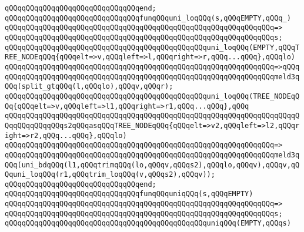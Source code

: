 \verb|qQQqqQQqqQQqqQQqqQQqqQQqqQQqqQQqend;|\newline
\newline
\newline
\verb|qQQqqQQqqQQqqQQqqQQqqQQqqQQqqQQqfunqQQquni_loqQQq(s,qQQqEMPTY,qQQq_)|\newline
\verb|qQQqqQQqqQQqqQQqqQQqqQQqqQQqqQQqqQQqqQQqqQQqqQQqqQQqqQQqqQQqqQQq=>|\newline
\verb|qQQqqQQqqQQqqQQqqQQqqQQqqQQqqQQqqQQqqQQqqQQqqQQqqQQqqQQqqQQqqQQqs;|\newline
\newline
\verb|qQQqqQQqqQQqqQQqqQQqqQQqqQQqqQQqqQQqqQQqqQQqqQQquni_loqQQq(EMPTY,qQQqTREE_NODEqQQq{qQQqelt=>v,qQQqleft=>l,qQQqright=>r,qQQq...qQQq},qQQqlo)|\newline
\verb|qQQqqQQqqQQqqQQqqQQqqQQqqQQqqQQqqQQqqQQqqQQqqQQqqQQqqQQqqQQqqQQq=>qQQq|\newline
\verb|qQQqqQQqqQQqqQQqqQQqqQQqqQQqqQQqqQQqqQQqqQQqqQQqqQQqqQQqqQQqqQQqmeld3qQQq(split_gtqQQq(l,qQQqlo),qQQqv,qQQqr);|\newline
\newline
\verb|qQQqqQQqqQQqqQQqqQQqqQQqqQQqqQQqqQQqqQQqqQQqqQQquni_loqQQq(TREE_NODEqQQq{qQQqelt=>v,qQQqleft=>l1,qQQqright=>r1,qQQq...qQQq},qQQq|\newline
\verb|qQQqqQQqqQQqqQQqqQQqqQQqqQQqqQQqqQQqqQQqqQQqqQQqqQQqqQQqqQQqqQQqqQQqqQQqqQQqqQQqqQQqs2qQQqasqQQqTREE_NODEqQQq{qQQqelt=>v2,qQQqleft=>l2,qQQqright=>r2,qQQq...qQQq},qQQqlo)|\newline
\verb|qQQqqQQqqQQqqQQqqQQqqQQqqQQqqQQqqQQqqQQqqQQqqQQqqQQqqQQqqQQqqQQq=>|\newline
\verb|qQQqqQQqqQQqqQQqqQQqqQQqqQQqqQQqqQQqqQQqqQQqqQQqqQQqqQQqqQQqqQQqmeld3qQQq(uni_bdqQQq(l1,qQQqtrimqQQq(lo,qQQqv,qQQqs2),qQQqlo,qQQqv),qQQqv,qQQquni_loqQQq(r1,qQQqtrim_loqQQq(v,qQQqs2),qQQqv));|\newline
\verb|qQQqqQQqqQQqqQQqqQQqqQQqqQQqqQQqend;|\newline
\newline
\newline
\verb|qQQqqQQqqQQqqQQqqQQqqQQqqQQqqQQqfunqQQquniqQQq(s,qQQqEMPTY)|\newline
\verb|qQQqqQQqqQQqqQQqqQQqqQQqqQQqqQQqqQQqqQQqqQQqqQQqqQQqqQQqqQQqqQQq=>|\newline
\verb|qQQqqQQqqQQqqQQqqQQqqQQqqQQqqQQqqQQqqQQqqQQqqQQqqQQqqQQqqQQqqQQqs;|\newline
\newline
\verb|qQQqqQQqqQQqqQQqqQQqqQQqqQQqqQQqqQQqqQQqqQQqqQQquniqQQq(EMPTY,qQQqs)|\newline
